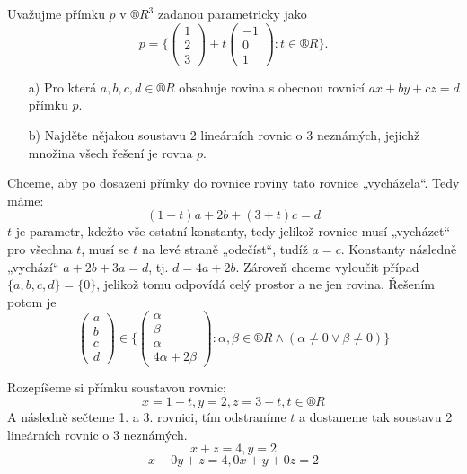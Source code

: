 \documentclass[12pt]{article}					%
\begin{document}
    \pagebreak

    \begin{priklad}[2.2]
        Uvažujme přímku $p$ v $®R^3$ zadanou parametricky jako
        $$ p = \{\begin{pmatrix} 1\\2\\3 \end{pmatrix} + t\begin{pmatrix} -1\\0\\1  \end{pmatrix}: t \in ®R \}. $$

        \begin{itemize}
            \item[a)] Pro která $a, b, c, d \in ®R$ obsahuje rovina s obecnou rovnicí $ax + by + cz = d$ přímku $p$.

            \item[b)] Najděte nějakou soustavu 2 lineárních rovnic o 3 neznámých, jejichž množina všech řešení je rovna $p$.
        \end{itemize}

        \begin{reseni}[a]
            Chceme, aby po dosazení přímky do rovnice roviny tato rovnice „vycházela“. Tedy máme:
            $$ (1-t)a + 2b + (3+t)c = d $$
            $t$ je parametr, kdežto vše ostatní konstanty, tedy jelikož rovnice musí „vycházet“ pro všechna $t$, musí se $t$ na levé straně „odečíst“, tudíž $a = c$. Konstanty následně „vychází“ $a + 2b +3a = d$, tj. $d = 4a + 2b$. Zároveň chceme vyloučit případ $\{a,b,c,d\} = \{0\}$, jelikož tomu odpovídá celý prostor a ne jen rovina. Řešením potom je
            $$ \begin{pmatrix} a\\ b\\ c\\ d \end{pmatrix} \in \{\begin{pmatrix} \alpha\\ \beta\\ \alpha\\ 4\alpha + 2\beta \end{pmatrix}: \alpha, \beta \in ®R \land (\alpha ≠ 0 \lor \beta ≠ 0)\} $$ 
        \end{reseni}

        \begin{reseni}[b]
            Rozepíšeme si přímku soustavou rovnic:
            $$ x = 1-t, y = 2, z = 3+t, t \in ®R $$
            A následně sečteme 1. a 3. rovnici, tím odstraníme $t$ a dostaneme tak soustavu 2 lineárních rovnic o 3 neznámých.
            $$ x + z = 4, y = 2 $$ 
            $$ x + 0y + z = 4, 0x + y + 0z = 2 $$ 
        \end{reseni}
    \end{priklad}
\end{document}
